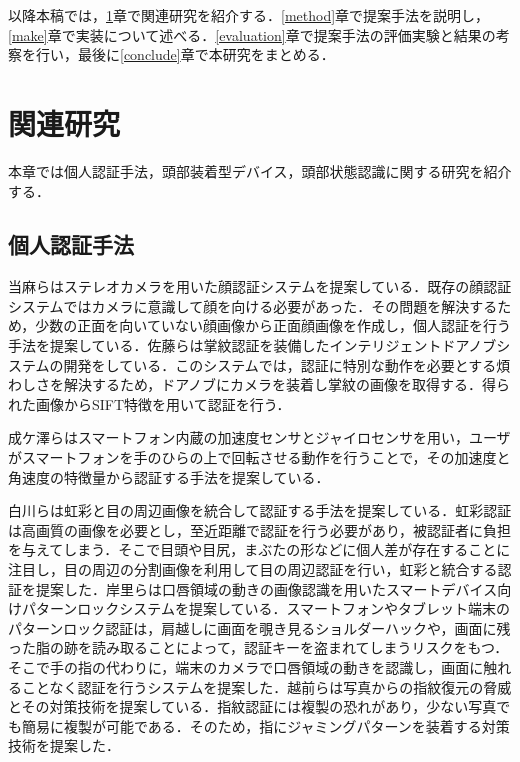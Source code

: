 \documentclass[Japanese,noauthor]{dicomopapers}
\begin{document}
以降本稿では，\ref{related}章で関連研究を紹介する．\ref{method}章で提案手法を説明し，\ref{make}章で実装について述べる．\ref{evaluation}章で提案手法の評価実験と結果の考察を行い，最後に\ref{conclude}章で本研究をまとめる．

\section{関連研究}
\label{related}
本章では個人認証手法，頭部装着型デバイス，頭部状態認識に関する研究を紹介する．
\subsection{個人認証手法}
当麻ら\cite{face}はステレオカメラを用いた顔認証システムを提案している．既存の顔認証システムではカメラに意識して顔を向ける必要があった．その問題を解決するため，少数の正面を向いていない顔画像から正面顔画像を作成し，個人認証を行う手法を提案している．佐藤ら\cite{door}は掌紋認証を装備したインテリジェントドアノブシステムの開発をしている．このシステムでは，認証に特別な動作を必要とする煩わしさを解決するため，ドアノブにカメラを装着し掌紋の画像を取得する．得られた画像からSIFT特徴を用いて認証を行う．\par

成ケ澤ら\cite{acceleration}はスマートフォン内蔵の加速度センサとジャイロセンサを用い，ユーザがスマートフォンを手のひらの上で回転させる動作を行うことで，その加速度と角速度の特徴量から認証する手法を提案している．\par

白川ら\cite{iris_eye}は虹彩と目の周辺画像を統合して認証する手法を提案している．虹彩認証は高画質の画像を必要とし，至近距離で認証を行う必要があり，被認証者に負担を与えてしまう．そこで目頭や目尻，まぶたの形などに個人差が存在することに注目し，目の周辺の分割画像を利用して目の周辺認証を行い，虹彩と統合する認証を提案した．岸里ら\cite{mouth_pattern}は口唇領域の動きの画像認識を用いたスマートデバイス向けパターンロックシステムを提案している．スマートフォンやタブレット端末のパターンロック認証は，肩越しに画面を覗き見るショルダーハックや，画面に残った脂の跡を読み取ることによって，認証キーを盗まれてしまうリスクをもつ．そこで手の指の代わりに，端末のカメラで口唇領域の動きを認識し，画面に触れることなく認証を行うシステムを提案した．越前ら\cite{finger_print}は写真からの指紋復元の脅威とその対策技術を提案している．指紋認証には複製の恐れがあり，少ない写真でも簡易に複製が可能である．そのため，指にジャミングパターンを装着する対策技術を提案した．\par
\end{document}
